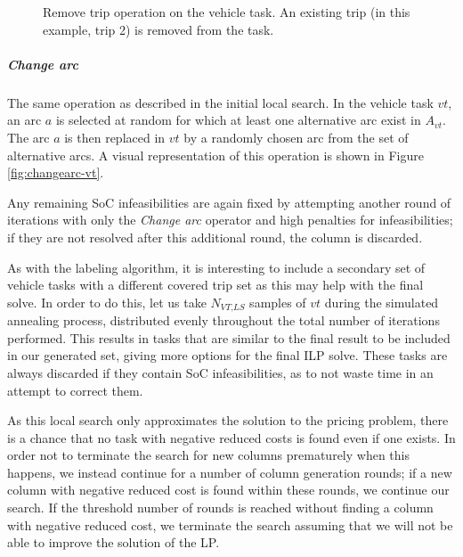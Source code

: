 \documentclass[]{article}
\begin{document}
\begin{figure}[h]
  \centering
  \caption{Remove trip operation on the vehicle task. An existing trip (in this example, trip 2) is removed from the task.}
  \label{fig:removetrip-vt}
\end{figure}
 
\subparagraph{Change arc} The same operation as described in the initial local search. In the vehicle task $vt$, an arc $a$ is selected at random for which at least one alternative arc exist in $A_{vt}$. The arc $a$ is then replaced in $vt$ by a randomly chosen arc from the set of alternative arcs. A visual representation of this operation is shown in Figure \ref{fig:changearc-vt}. 

\noindent Any remaining SoC infeasibilities are again fixed by attempting another round of iterations with only the \textit{Change arc} operator and high penalties for infeasibilities; if they are not resolved after this additional round, the column is discarded.

As with the labeling algorithm, it is interesting to include a secondary set of vehicle tasks with a different covered trip set as this may help with the final solve. In order to do this, let us take $N_{\textit{VT,LS}}$ samples of $vt$ during the simulated annealing process, distributed evenly throughout the total number of iterations performed. This results in tasks that are similar to the final result to be included in our generated set, giving more options for the final ILP solve. These tasks are always discarded if they contain SoC infeasibilities, as to not waste time in an attempt to correct them.

As this local search only approximates the solution to the pricing problem, there is a chance that no task with negative reduced costs is found even if one exists. In order not to terminate the search for new columns prematurely when this happens, we instead continue for a number of column generation rounds; if a new column with negative reduced cost is found within these rounds, we continue our search. If the threshold number of rounds is reached without finding a column with negative reduced cost, we terminate the search assuming that we will not be able to improve the solution of the LP.
\end{document}
